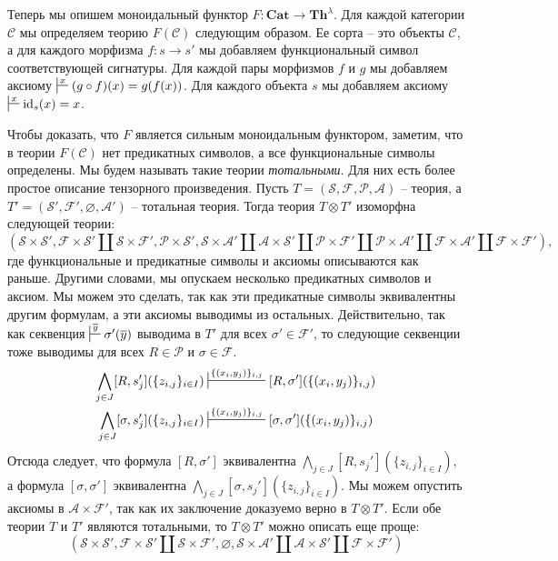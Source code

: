 \documentclass[reqno]{amsart}
\theoremstyle{definition}
\theoremstyle{remark}
\newcommand{\bcat}[1]{\mathbf{#1}}
\newcommand{\cat}[1]{\mathcal{#1}}
\renewcommand{\C}{\cat{C}}
\newcommand{\fs}[1]{\mathrm{#1}}
\newcommand{\Th}{\bcat{Th}}
\newcommand{\Cat}{\bcat{Cat}}
\begin{document}
Теперь мы опишем моноидальный функтор $F : \Cat \to \Th^\lambda$.
Для каждой категории $\C$ мы определяем теорию $F(\C)$ следующим образом.
Ее сорта -- это объекты $\C$, а для каждого морфизма $f : s \to s'$ мы добавляем функциональный символ соответствующей сигнатуры.
Для каждой пары морфизмов $f$ и $g$ мы добавляем аксиому $\sststile{}{x} (g \circ f)(x) = g(f(x))$.
Для каждого объекта $s$ мы добавляем аксиому $\sststile{}{x} \fs{id}_s(x) = x$.

Чтобы доказать, что $F$ является сильным моноидальным функтором, заметим, что в теории $F(\C)$ нет предикатных символов, а все функциональные символы определены.
Мы будем называть такие теории \emph{тотальными}.
Для них есть более простое описание тензорного произведения.
Пусть $T = (\mathcal{S},\mathcal{F},\mathcal{P},\mathcal{A})$ -- теория, а $T' = (\mathcal{S}',\mathcal{F}',\varnothing,\mathcal{A}')$ -- тотальная теория.
Тогда теория $T \otimes T'$ изоморфна следующей теории:
\[ (\mathcal{S} \times \mathcal{S}', \mathcal{F} \times \mathcal{S}' \amalg \mathcal{S} \times \mathcal{F}', \mathcal{P} \times \mathcal{S}', \mathcal{S} \times \mathcal{A}' \amalg \mathcal{A} \times \mathcal{S}' \amalg \mathcal{P} \times \mathcal{F}' \amalg \mathcal{P} \times \mathcal{A}' \amalg \mathcal{F} \times \mathcal{A}' \amalg \mathcal{F} \times \mathcal{F}'), \]
где функциональные и предикатные символы и аксиомы описываются как раньше.
Другими словами, мы опускаем несколько предикатных символов и аксиом.
Мы можем это сделать, так как эти предикатные символы эквивалентны другим формулам, а эти аксиомы выводимы из остальных.
Действительно, так как секвенция $\sststile{}{\overline{y}} \sigma'(\overline{y})$ выводима в $T'$ для всех $\sigma' \in \mathcal{F}'$, то следующие секвенции тоже выводимы для всех $R \in \mathcal{P}$ и $\sigma \in \mathcal{F}$.
\begin{align*}
\bigwedge_{j \in J} [R,s_j'](\{ z_{i,j} \}_{i \in I}) & \sststile{}{\{ (x_i,y_j) \}_{i,j}} [R,\sigma'](\{ (x_i,y_j) \}_{i,j}) \\
\bigwedge_{j \in J} [\sigma,s_j'](\{ z_{i,j} \}_{i \in I}) & \sststile{}{\{ (x_i,y_j) \}_{i,j}} [\sigma,\sigma'](\{ (x_i,y_j) \}_{i,j})
\end{align*}
Отсюда следует, что формула $[R,\sigma']$ эквивалентна $\bigwedge_{j \in J} [R,s_j'](\{ z_{i,j} \}_{i \in I})$, а формула $[\sigma,\sigma']$ эквивалентна $\bigwedge_{j \in J} [\sigma,s_j'](\{ z_{i,j} \}_{i \in I})$.
Мы можем опустить аксиомы в $\mathcal{A} \times \mathcal{F}'$, так как их заключение доказуемо верно в $T \otimes T'$.
Если обе теории $T$ и $T'$ являются тотальными, то $T \otimes T'$ можно описать еще проще:
\[ (\mathcal{S} \times \mathcal{S}', \mathcal{F} \times \mathcal{S}' \amalg \mathcal{S} \times \mathcal{F}', \varnothing, \mathcal{S} \times \mathcal{A}' \amalg \mathcal{A} \times \mathcal{S}' \amalg \mathcal{F} \times \mathcal{F}') \]
\end{document}
